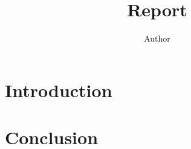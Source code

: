 
\title{Report}
\author{Author}

\maketitle

\tableofcontents

\section{Introduction}

\section{Conclusion}    


